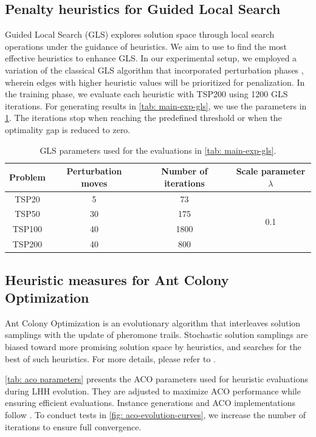 \subsection{Penalty heuristics for Guided Local Search}

Guided Local Search (GLS) explores solution space through local search operations under the guidance of heuristics. We aim to use \our{} to find the most effective heuristics to enhance GLS. In our experimental setup, we employed a variation of the classical GLS algorithm \cite{Voudouris_Tsang_1999} that incorporated perturbation phases \cite{arnold2019_KGLS_VRP}, wherein edges with higher heuristic values will be prioritized for penalization. In the training phase, we evaluate each heuristic with TSP200 using 1200 GLS iterations. For generating results in \cref{tab: main-exp-gls}, we use the parameters in \cref{tab: gls parameters}. The iterations stop when reaching the predefined threshold or when the optimality gap is reduced to zero.


\begin{table}[]
    \small
    \centering
    \caption{GLS parameters used for the evaluations in \cref{tab: main-exp-gls}.}
    \begin{tabular}{c|ccc}
    \toprule
        Problem & Perturbation moves & Number of iterations & Scale parameter $\lambda$ \\
        \midrule
         TSP20  &  5   & 73  &  \multirow{4}{*}{0.1}   \\
         TSP50  &  30  & 175 \\
         TSP100 &  40  & 1800 \\
         TSP200 &  40  & 800  \\
         \bottomrule
    \end{tabular}
    \label{tab: gls parameters}
\end{table}

\subsection{Heuristic measures for Ant Colony Optimization}
Ant Colony Optimization is an evolutionary algorithm that interleaves solution samplings with the update of pheromone trails. Stochastic solution samplings are biased toward more promising solution space by heuristics, and \our{} searches for the best of such heuristics. For more details, please refer to \cite{ye2023deepaco}.

\cref{tab: aco parameters} presents the ACO parameters used for heuristic evaluations during LHH evolution. They are adjusted to maximize ACO performance while ensuring efficient evaluations. Instance generations and ACO implementations follow \citet{ye2023deepaco}. To conduct tests in \cref{fig: aco-evolution-curves}, we increase the number of iterations to ensure full convergence.


